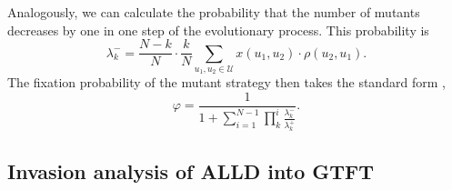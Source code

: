 \documentclass[11pt]{article}
\theoremstyle{plainCl1}
\theoremstyle{plainCl2}
\begin{document}
Analogously, we can calculate the probability that the number of mutants decreases by one in one step of the evolutionary process. This probability is
\begin{equation}
\lambda^-_k=\frac{N\!-\!k}{N}\cdot\frac{k}{N} \sum_{u_1,u_2\in\mathcal{U}} x(u_1,u_2)\cdot \rho(u_2,u_1).
\end{equation}
The fixation probability of the mutant strategy then takes the standard form \cite{nowak2004emergence},
\begin{equation}
\varphi = \frac{1}{1+\sum_{i=1}^{N-1}\prod_k^i \frac{\lambda^-_k}{\lambda^+_k}}.
\end{equation}


\subsection{Invasion analysis of ALLD into GTFT}
\end{document}

